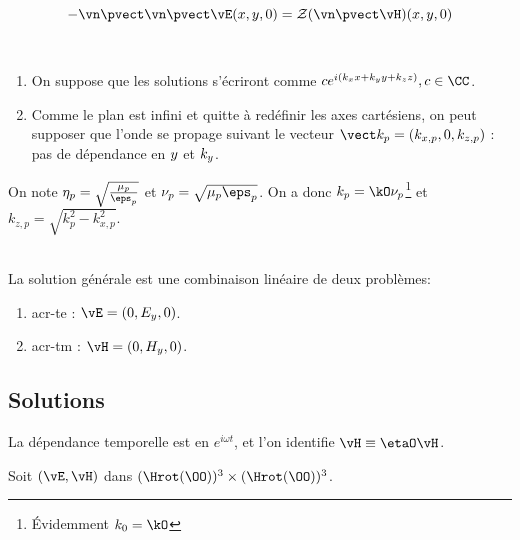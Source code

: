 \begin{equation}
\label{eq:coeff_ref:intro:ci}
-\vn \pvect \vn \pvect \vE(\x,\y,0) = \mathcal{Z}( \vn \pvect \vH)(\x,\y,0)
\end{equation}

\begin{hyp}{}~\\
\begin{enumerate}
    \item On suppose que les solutions s'écriront comme \(c e^{i(k_\x\x +k_\y\y+k_\z\z)}, c\in\CC\).
    \item Comme le plan est infini et quitte à redéfinir les axes cartésiens, on peut supposer que l'onde se propage suivant le vecteur \(\vect k_p = (k_{\x,p},0,k_{\z,p})\) : pas de dépendance en \({y}\) et \(k_{y}\).
\end{enumerate}
\end{hyp}

On note \(\eta_p = \sqrt{\frac{\mu_p}{\eps_p}}\) et \(\nu_p = \sqrt{\mu_p \eps_p}\).
On a donc \(k_p = \kO\nu_p\)\footnote{Évidemment \(k_0 = \kO\)} et \(k_{z,p} = \sqrt{k_p^2 - k_{x,p}^2}\).

\begin{hyp}{}~\\
La solution générale est une combinaison linéaire de deux problèmes: 
\begin{enumerate}
    \item \gls{acr-te} : \(\vE = (0,E_y,0)\).
    \item \gls{acr-tm} : \(\vH = (0,H_y,0)\). 
\end{enumerate}
\end{hyp}

\subsection{Solutions}

\begin{tcolorbox}
\centering
La dépendance temporelle est en \(e^{i \omega t}\), et l'on identifie \(\vH \equiv \etaO \vH\).
\end{tcolorbox}


Soit \((\vE,\vH)\) dans \((\Hrot(\OO))^3 \times (\Hrot(\OO))^3\). 

